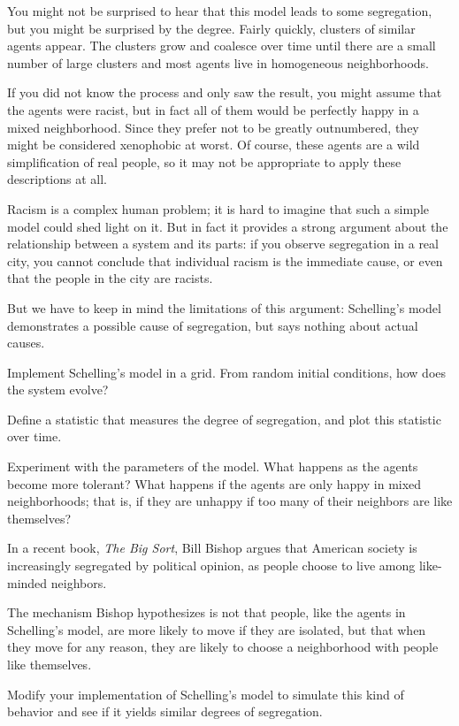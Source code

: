 \documentclass[10pt]{book}
\begin{document}
You might not be surprised to hear that this model leads to some
segregation, but you might be surprised by the degree.  Fairly
quickly, clusters of similar agents appear.  The clusters
grow and coalesce over time until there are a small number
of large clusters and most agents live in homogeneous
neighborhoods.

If you did not know the process and only saw the result, you might
assume that the agents were racist, but in fact all of them
would be perfectly happy in a mixed neighborhood.  Since they prefer
not to be greatly outnumbered, they might be considered xenophobic at
worst.  Of course, these agents are a wild simplification of real
people, so it may not be appropriate to apply these descriptions at
all.

Racism is a complex human problem; it is hard to imagine that such a
simple model could shed light on it.  But in fact it provides a strong
argument about the relationship between a system and its parts: if you
observe segregation in a real city, you cannot conclude that
individual racism is the immediate cause, or even that the people in
the city are racists.

But we have to keep in mind the limitations of this argument:
Schelling's model demonstrates a possible cause of segregation, but
says nothing about actual causes.

\begin{exercise}

Implement Schelling's model in a grid.  From random initial conditions,
how does the system evolve?

Define a statistic that measures the degree of segregation, and plot
this statistic over time.

Experiment with the parameters of the model.  What happens as the agents
become more tolerant?  What happens if the agents are only happy in
mixed neighborhoods; that is, if they are unhappy if too many of their
neighbors are like themselves?

\end{exercise}


\begin{exercise}

In a recent book, {\em The Big Sort}, Bill Bishop argues that
American society is increasingly segregated by political
opinion, as people choose to live among like-minded neighbors.

The mechanism Bishop hypothesizes is not that people, like the agents
in Schelling's model, are more likely to move if they are
isolated, but that when they move for any reason, they are
likely to choose a neighborhood with people like themselves.

Modify your implementation of Schelling's model to simulate
this kind of behavior and see if it yields similar degrees of
segregation.

\end{exercise}
\end{document}
